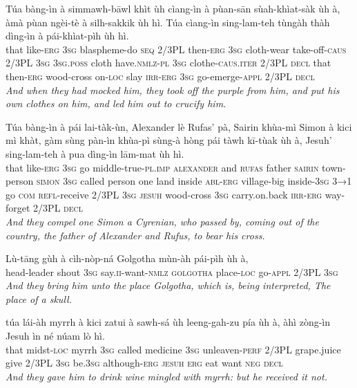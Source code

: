 \documentclass[11pt,a4paper]{article}
\begin{document}
\begin{exe}
\gll Túa bàng-ìn à simmawh-bāwl khìt ùh cìang-ìn à pùan-sān sùah-khìat-sàk ùh à, àmà pùan ngèi-tè à silh-sakkik ùh hì. Túa cìang-ìn sing-lam-teh tùngàh thàh dìng-ìn à pái-khìat-pìh ùh hì. \\
     that like-\textsc{erg} \textsc{3sg} blaspheme-do \textsc{seq} 2/3PL then-\textsc{erg} \textsc{3sg} cloth-wear take-off-\textsc{caus} 2/3PL \textsc{3sg} \textsc{3sg}.\textsc{poss} cloth have.\textsc{nmlz}-\textsc{pl} \textsc{3sg} clothe-\textsc{caus}.\textsc{iter} 2/3PL \textsc{decl} that then-\textsc{erg} wood-cross on-\textsc{loc} slay \textsc{irr}-\textsc{erg} \textsc{3sg} go-emerge-\textsc{appl} 2/3PL \textsc{decl} \\
\glt \textcolor{kjvcolor}{\textit{And when they had mocked him, they took off the purple from him, and put his own clothes on him, and led him out to crucify him.}}

\gll Túa bàng-ìn à pái lai-tàk-ùn, Alexander lè Rufas' pà, Sairin khùa-mì Simon à kici mì khàt, gàm sùng pàn-ìn khùa-pì sùng-à hòng pái tàwh kī-tùak ùh à, Jesuh' sing-lam-teh à pua dìng-ìn lām-mat ùh hì. \\
     that like-\textsc{erg} \textsc{3sg} go middle-true-\textsc{pl}.\textsc{imp} \textsc{alexander} and \textsc{rufas} father \textsc{sairin} town-person \textsc{simon} \textsc{3sg} called person one land inside \textsc{abl}-\textsc{erg} village-big inside-\textsc{3sg} \textsc{3→1} go \textsc{com} \textsc{refl}-receive 2/3PL \textsc{3sg} \textsc{jesuh} wood-cross \textsc{3sg} carry.on.back \textsc{irr}-\textsc{erg} way-forget 2/3PL \textsc{decl} \\
\glt \textcolor{kjvcolor}{\textit{And they compel one Simon a Cyrenian, who passed by, coming out of the country, the father of Alexander and Rufus, to bear his cross.}}

\gll Lù-tāng gùh à cìh-nòp-ná Golgotha mùn-àh pái-pìh ùh à, \\
     head-leader shout \textsc{3sg} say.\textsc{ii}-want-\textsc{nmlz} \textsc{golgotha} place-\textsc{loc} go-\textsc{appl} 2/3PL \textsc{3sg} \\
\glt \textcolor{kjvcolor}{\textit{And they bring him unto the place Golgotha, which is, being interpreted, The place of a skull.}}

\gll túa lái-àh myrrh à kici zatui à sawh-sá ùh leeng-gah-zu pía ùh à, àhì zòng-ìn Jesuh ìn né núam lò hì. \\
     that midst-\textsc{loc} myrrh \textsc{3sg} called medicine \textsc{3sg} unleaven-\textsc{perf} 2/3PL grape.juice give 2/3PL \textsc{3sg} be.\textsc{3sg} although-\textsc{erg} \textsc{jesuh} \textsc{erg} eat want \textsc{neg} \textsc{decl} \\
\glt \textcolor{kjvcolor}{\textit{And they gave him to drink wine mingled with myrrh: but he received it not.}}


\end{exe}
\end{document}
